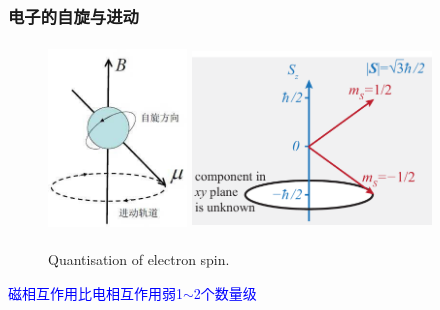 {\frame
{
	\frametitle{电子的自旋与进动}
\begin{figure}[h!]
\vspace*{-0.08in}
\centering
\includegraphics[height=1.95in,width=1.45in,viewport=0 0 210 270,clip]{Figures/Spin_spinor.jpg}
\includegraphics[height=1.95in,width=2.50in,viewport=0 0 580 415,clip]{Figures/Quantization-electron-spin.png}
\caption{\tiny \textrm{Quantisation of electron spin.}}%
\label{Fig:Electron-spin-spinor}
\end{figure}
\textcolor{blue}{磁相互作用比电相互作用弱1$\sim$2个数量级}
}

}
